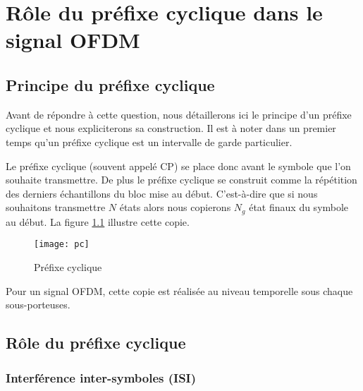 \chapter{Rôle du préfixe cyclique dans le signal OFDM}

\section{Principe du préfixe cyclique}

Avant de répondre à cette question, nous détaillerons ici le principe d'un
préfixe cyclique et nous expliciterons sa construction. Il est à noter dans un
premier temps qu'un préfixe cyclique est un intervalle de garde
particulier. ~\\


Le préfixe cyclique (souvent appelé CP) se place donc avant le symbole que l'on
souhaite transmettre. De plus le préfixe cyclique se construit comme la
répétition des derniers échantillons du bloc mise au début. C'est-à-dire que si
nous souhaitons transmettre $N$ états alors nous copierons $N_g$ état finaux du
symbole au début. La figure \ref{fig:PC} illustre cette copie.

\begin{figure}[!h]
  \centering
  \texttt{[image: pc]}
  \caption{Préfixe cyclique ~\cite{supelec}} %
  \label{fig:PC}
\end{figure}

Pour un signal OFDM, cette copie est réalisée au niveau temporelle sous chaque
sous-porteuses.

\section{Rôle du préfixe cyclique}

\subsection{Interférence inter-symboles (ISI)}
\label{sec:ISI}





